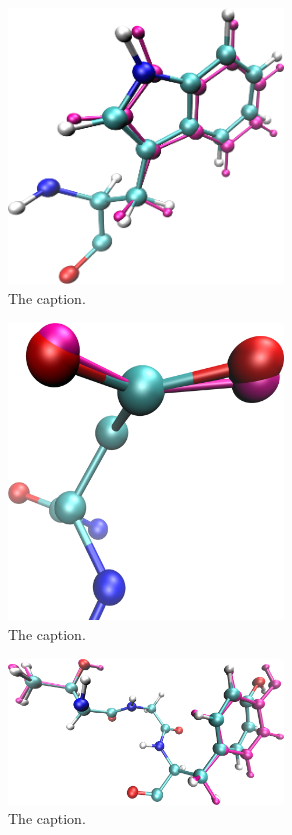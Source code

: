\begin{figure}[h]
  \centering
  \includegraphics[width=0.65\textwidth,height=0.3\textheight,keepaspectratio]{figures/mutation_side_chain_images/1fcc_43.png}
  \caption{The caption.}
  \label{figure:computational_mutation_scanning/figname}
\end{figure}


\begin{figure}[h]
  \centering
  \includegraphics[width=0.65\textwidth,height=0.3\textheight,keepaspectratio]{figures/mutation_side_chain_images/1brs_chain_d_35.png}
  \caption{The caption.}
  \label{figure:computational_mutation_scanning/figname}
\end{figure}

\begin{figure}[h]
  \centering
  \includegraphics[width=0.65\textwidth,height=0.3\textheight,keepaspectratio]{figures/mutation_side_chain_images/1dvf_chain_b_30_and_32.png}
  \caption{The caption.}
  \label{figure:computational_mutation_scanning/figname}
\end{figure}


